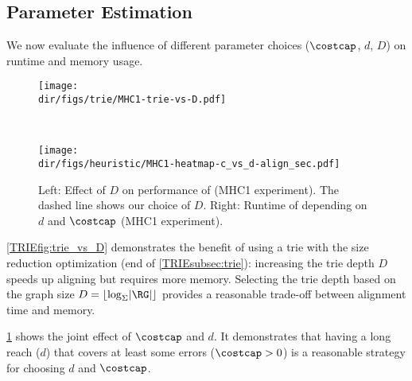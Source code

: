 \subsection{Parameter Estimation} \label{TRIEsubsec:parameter_estimation}
We now evaluate the influence of different parameter choices ($\costcap$, $d$,
$D$) on runtime and memory usage.

\begin{figure}[b]
	\centering
	\begin{minipage}{0.48\linewidth}
		\centering
		\texttt{[image: \\dir/figs/trie/MHC1-trie-vs-D.pdf]}
		\caption{Left: Effect of $D$ on performance of \astarix (MHC1 experiment). The dashed line shows our choice of $D$. Right: Runtime of \astarix depending on $d$ and $\costcap$ (MHC1 experiment).}
		\label{TRIEfig:trie_vs_D}
	\end{minipage}~\hspace{0.7em}
	\begin{minipage}{0.49\linewidth}
		\centering
		\texttt{[image: \\dir/figs/heuristic/MHC1-heatmap-c\_vs\_d-align\_sec.pdf]}
		\label{TRIEfig:heuristic-parameters}
	\end{minipage}
\end{figure}

\cref{TRIEfig:trie_vs_D} demonstrates the benefit of using a trie with the size
reduction optimization (end of \cref{TRIEsubsec:trie}): increasing the trie depth
$D$ speeds up aligning but requires more memory. Selecting the trie depth based
on the graph size \mbox{$D = \lfloor \log_\Sigma \lvert \RG \rvert \rfloor$}
provides a reasonable trade-off between alignment time and memory.

\cref{TRIEfig:heuristic-parameters} shows the joint effect of $\costcap$ and $d$. It
demonstrates that having a long reach ($d$) that covers at least some errors
($\costcap > 0$) is a reasonable strategy for choosing $d$ and $\costcap$.